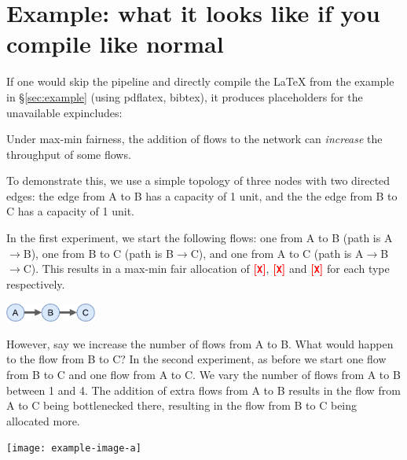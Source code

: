 \section{Example: what it looks like if you compile like normal}
\label{sec:compile-like-normal}

If one would skip the \sysname pipeline and directly compile the \LaTeX{} from the example in \S\ref{sec:example} (\ie using pdflatex, bibtex), it produces placeholders for the unavailable expincludes:

\vspace{0.2cm}
\begin{mdframed}[style=annotex]

Under max-min fairness, the addition of flows to the network can \emph{increase} the throughput of some flows.

To demonstrate this, we use a simple topology of three nodes with two directed edges:
the edge from A to B has a capacity of 1 unit,
and the the edge from B to C has a capacity of 1 unit.

In the first experiment, we start the following flows: one from A to B (path is A$\rightarrow$B), one from B to C (path is B$\rightarrow$C), and one from A to C (path is A$\rightarrow$B$\rightarrow$C).
This results in a max-min fair allocation of \textbf{\textcolor{red}{[\texttt{X}]}}, \textbf{\textcolor{red}{[\texttt{X}]}} and \textbf{\textcolor{red}{[\texttt{X}]}} for each type respectively.

\begin{center}
\includegraphics[width=3cm]{figures/topology-example.pdf}
\end{center}

However, say we increase the number of flows from A to B. What would happen to the flow from B to C? In the second experiment, as before we start one flow from B to C and one flow from A to C. We vary the number of flows from A to B between 1 and 4. The addition of extra flows from A to B results in the flow from A to C being bottlenecked there, resulting in the flow from B to C being allocated more.

\begin{center}
\texttt{[image: example-image-a]}
\end{center}

\end{mdframed}

